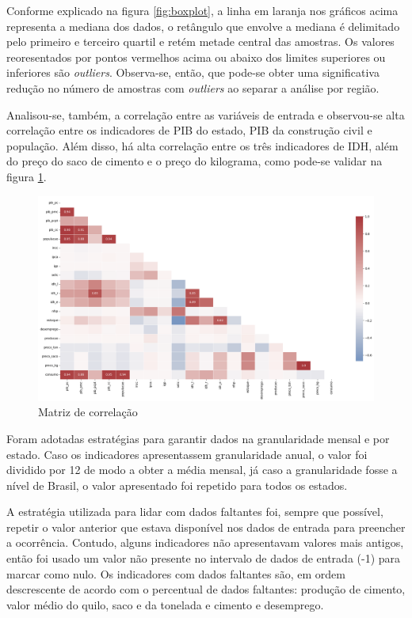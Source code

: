 Conforme explicado na figura \ref{fig:boxplot}, a linha em 
laranja nos gráficos acima representa a mediana dos dados,
o retângulo que envolve a mediana é delimitado pelo primeiro e 
terceiro quartil e retém metade central das amostras. Os valores
reoresentados por pontos vermelhos acima ou abaixo dos limites
superiores ou inferiores são \textit{outliers}. Observa-se,
então, que pode-se obter uma significativa redução no número de 
amostras com \textit{outliers} ao separar a análise por região.\cite{boxplot}

Analisou-se, também, a correlação entre as variáveis de entrada e observou-se
alta correlação entre os indicadores de PIB do estado, PIB da construção
civil e população. Além disso, há alta correlação entre os três indicadores
de IDH, além do preço do saco de cimento e o preço do kilograma, como pode-se
validar na figura \ref{fig:matriz-corr}.

\begin{figure}[H]
    \centering
    \includegraphics[width=13cm]{../figuras/graficos/matriz-corr.png}
    \caption{Matriz de correlação}
    \label{fig:matriz-corr}
\end{figure}

Foram adotadas estratégias para garantir dados na granularidade
mensal e por estado. Caso os indicadores apresentassem granularidade anual, 
o valor foi dividido por 12 de modo a obter a média mensal, já caso a granularidade
fosse a nível de Brasil, o valor apresentado foi repetido para todos os 
estados.


A estratégia utilizada para lidar com dados faltantes foi, sempre que possível,
repetir o valor anterior que estava disponível nos dados de entrada para
preencher a ocorrência. Contudo, alguns indicadores não apresentavam 
valores mais antigos, então foi usado um valor não presente no intervalo
de dados de entrada (-1) para marcar como nulo. Os indicadores 
com dados faltantes são, em ordem descrescente de acordo com 
o percentual de dados faltantes: produção de cimento, valor 
médio do quilo, saco e da tonelada e cimento e desemprego.

